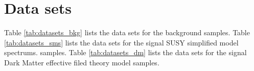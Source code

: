 \section{Data sets}
\label{sec:datasets}


Table \ref{tab:datasets_bkg} lists the data sets for the background
samples. Table \ref{tab:datasets_sms} lists the data sets for the signal
SUSY simplified model spectrums. samples. Table \ref{tab:datasets_dm}
lists the data sets for the signal
Dark Matter effective filed theory model samples.


\begin{landscape}
\begin{table}[!h]
\scriptsize 
\label{tab:datasets_bkg}
\end{table}
\end{landscape}

\begin{landscape}
\begin{table}[!h]
\scriptsize 
\label{tab:datasets_sms}
\end{table}

\begin{table}[!h]
\scriptsize 
\label{tab:datasets_dm}
\end{table}
\end{landscape}



